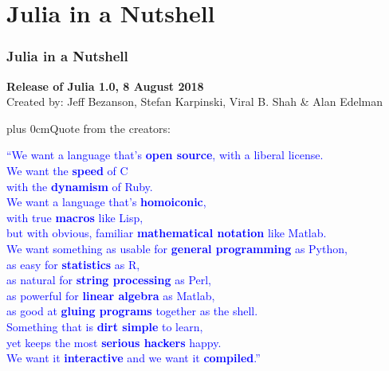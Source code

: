 \documentclass[slidestop,compress,mathserif]{beamer}
\renewcommand{\raggedright}{\leftskip=0pt \rightskip=0pt plus 0cm}
\begin{document}

\section{Julia in a Nutshell}
\begin{frame}
\frametitle{Julia in a Nutshell}


\begin{center}
    \fontsize{10pt}{7.2}\selectfont \textbf{Release of Julia 1.0, 8 August 2018} \\ 
    \fontsize{9pt}{7.2}\selectfont Created by: Jeff Bezanson, Stefan Karpinski, Viral B. Shah & Alan Edelman\\
\end{center}
\raggedright \fontsize{8pt}{7.2}\selectfont \vfill Quote from the creators:\\
\begin{center}
\textcolor{blue}{\fontsize{10.3pt}{3}\selectfont
“We want a language that’s \textbf{open source}, with a liberal
license.\\
We want the \textbf{speed} of C\\
 with the \textbf{dynamism} of Ruby.\\
We want a language that’s \textbf{homoiconic},\\
 with true \textbf{macros} like Lisp,\\
 but with obvious, familiar \textbf{mathematical notation} like Matlab.\\
We want something as usable for \textbf{general programming} as Python,\\
 as easy for \textbf{statistics} as R,\\
 as natural for \textbf{string processing} as Perl,\\
 as powerful for \textbf{linear algebra} as Matlab,\\
 as good at \textbf{gluing programs} together as the shell.\\
 Something that is \textbf{dirt simple} to learn,\\
 yet keeps the most \textbf{serious hackers} happy.\\
 We want it \textbf{interactive} and we want it \textbf{compiled}.”
 }
 \end{center}
\end{frame}
\end{document}

